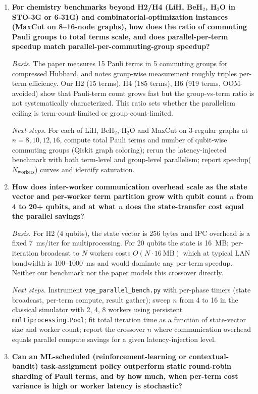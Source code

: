 \begin{enumerate}
\item \textbf{For chemistry benchmarks beyond H2/H4 (LiH, BeH$_2$, H$_2$O in STO-3G or 6-31G) and combinatorial-optimization instances (MaxCut on 8--16-node graphs), how does the ratio of commuting Pauli groups to total terms scale, and does parallel-per-term speedup match parallel-per-commuting-group speedup?}

\emph{Basis.} The paper measures 15 Pauli terms in 5 commuting groups for compressed Hubbard, and notes group-wise measurement roughly triples per-term efficiency. Our H2 (15 terms), H4 (185 terms), H6 (919 terms, OOM-avoided) show that Pauli-term count grows fast but the group-vs-term ratio is not systematically characterized. This ratio sets whether the parallelism ceiling is term-count-limited or group-count-limited.

\emph{Next steps.} For each of LiH, BeH$_2$, H$_2$O and MaxCut on 3-regular graphs at $n = 8, 10, 12, 16$, compute total Pauli terms and number of qubit-wise commuting groups (Qiskit graph coloring); rerun the latency-injected benchmark with both term-level and group-level parallelism; report speedup($N_{\mathrm{workers}}$) curves and identify saturation.

\item \textbf{How does inter-worker communication overhead scale as the state vector and per-worker term partition grow with qubit count $n$ from 4 to 20+ qubits, and at what $n$ does the state-transfer cost equal the parallel savings?}

\emph{Basis.} For H2 (4 qubits), the state vector is 256 bytes and IPC overhead is a fixed 7~ms/iter for multiprocessing. For 20 qubits the state is 16~MB; per-iteration broadcast to $N$ workers costs $O(N \cdot 16~\mathrm{MB})$ which at typical LAN bandwidth is 100--1000~ms and would dominate any per-term speedup. Neither our benchmark nor the paper models this crossover directly.

\emph{Next steps.} Instrument \texttt{vqe\_parallel\_bench.py} with per-phase timers (state broadcast, per-term compute, result gather); sweep $n$ from 4 to 16 in the classical simulator with 2, 4, 8 workers using persistent \texttt{multiprocessing.Pool}; fit total iteration time as a function of state-vector size and worker count; report the crossover $n$ where communication overhead equals parallel compute savings for a given latency-injection level.

\item \textbf{Can an ML-scheduled (reinforcement-learning or contextual-bandit) task-assignment policy outperform static round-robin sharding of Pauli terms, and by how much, when per-term cost variance is high or worker latency is stochastic?}


\end{enumerate}
